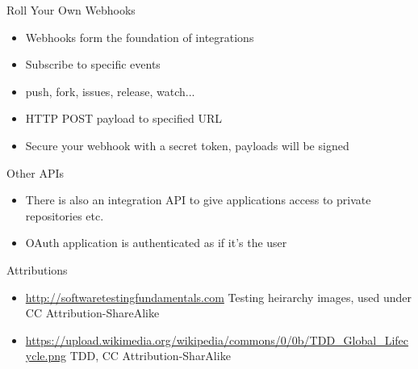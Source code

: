 \documentclass{beamer}
\begin{document}
\begin{frame}{Roll Your Own}
	Webhooks
	\begin{itemize}
		\item Webhooks form the foundation of integrations
		\item Subscribe to specific events
		\item push, fork, issues, release, watch...
		\item HTTP POST payload to specified URL
		\item Secure your webhook with a secret token, payloads will be signed
	\end{itemize}
	Other APIs
	\begin{itemize}
		\item There is also an integration API to give applications access to private repositories etc.
		\item OAuth application is authenticated as if it's the user
	\end{itemize}
\end{frame}

\begin{frame}{Attributions}
	\begin{itemize}
		\item \url{http://softwaretestingfundamentals.com} Testing heirarchy images, used under CC Attribution-ShareAlike
		\item \url{https://upload.wikimedia.org/wikipedia/commons/0/0b/TDD_Global_Lifecycle.png} TDD, CC Attribution-SharAlike
	\end{itemize}
\end{frame}
\end{document}
